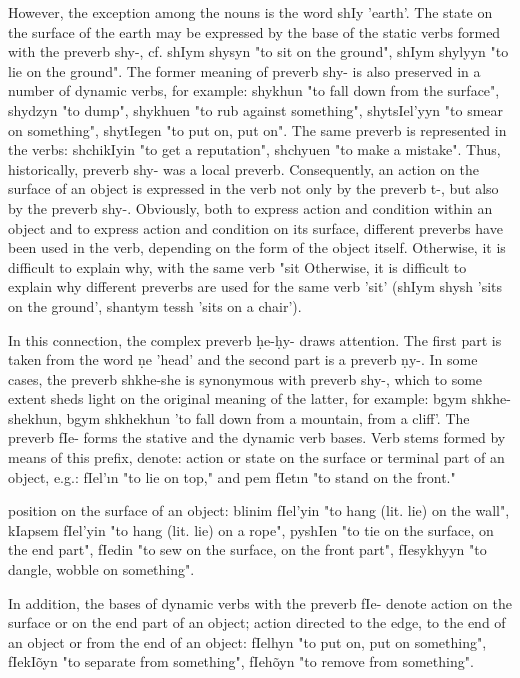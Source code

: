 \documentclass[a4paper,12pt]{book}
\newcommand{\1}[1]{\textbf{\emph{#1}}} %
\newcommand{\2}[1]{\textbf{[#1]}} %
\newcommand{\3}[1]{\fontsize{11pt}{0cm}\textbf{\emph{#1}}} %
\newcommand{\4}[1]{\fontsize{10pt}{0cm}\emph{#1}}	%
\newcommand{\5}[1]{\textbf{/#1/}} %
\newcommand{\6}[1]{\textbf{[#1]}} %
\newcommand{\7}[1]{\fontsize{12pt}{0cm}\emph{#1}} %
\newcommand{\8}[1]{\fontsize{12pt}{0cm}`#1'} %
\newcommand{\9}[1]{\fontsize{12pt}{0cm}(lit. `#1')} %
\begin{document}
However, the exception among the nouns is the word shIy 'earth'. The state on the surface of the earth may be expressed by the base of the static verbs formed with the preverb shy-, cf. shIym shysyn "to sit on the ground", shIym shylyyn "to lie on the ground".
The former meaning of preverb shy- is also preserved in a number of dynamic verbs, for example: shykhun "to fall down from the surface", shydzyn "to dump", shykhuen "to rub against something", shytsIel'yyn "to smear on something", shytIegen "to put on, put on".
The same preverb is represented in the verbs: shchikIyin "to get a reputation", shchyuen "to make a mistake".
Thus, historically, preverb shy- was a local preverb.
Consequently, an action on the surface of an object is expressed in the verb not only by the preverb t-, but also by the preverb shy-. Obviously, both to express action and condition within an object and to express action and condition on its surface, different preverbs have been used in the verb, depending on the form of the object itself. Otherwise, it is difficult to explain why, with the same verb "sit Otherwise, it is difficult to explain why different preverbs are used for the same verb 'sit' (shIym shysh 'sits on the ground', shantym tessh 'sits on a chair').

In this connection, the complex preverb ḥe-ḥy- draws attention. The first part is taken from the word ṇe 'head' and the second part is a preverb ṇy-. In some cases, the preverb shkhe-she is synonymous with preverb shy-, which to some extent sheds light on the original meaning of the latter, for example: bgym shkhe-shekhun, bgym shkhekhun 'to fall down from a mountain, from a cliff'.
The preverb fIe- forms the stative and the dynamic verb bases. Verb stems formed by means of this prefix, denote:
action or state on the surface or terminal part of an object, e.g.: fIel'ın "to lie on top," and pem fIetın "to stand on the front."

position on the surface of an object: blinim fIel'yin "to hang (lit. lie) on the wall", kIapsem fIel'yin "to hang (lit. lie) on a rope", pyshIen "to tie on the surface, on the end part", fIedin "to sew on the surface, on the front part", fIesykhyyn "to dangle, wobble on something".

In addition, the bases of dynamic verbs with the preverb fIe- denote action on the surface or on the end part of an object; action directed to the edge, to the end of an object or from the end of an object: fIelhyn "to put on, put on something", fIekIõyn "to separate from something", fIehõyn "to remove from something".
\end{document}
